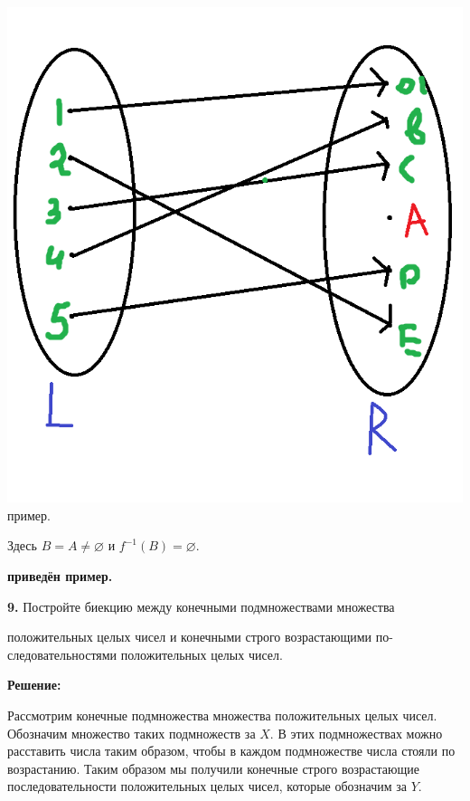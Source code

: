 \documentclass[a4paper,12pt]{article} %
\begin{document}
\begin{center}
\includegraphics[scale=0.5]{6 1}
пример.
\end{center}

Здесь $ B = {A} \neq \varnothing$ и $f^{-1}(B) = \varnothing$.

\begin{flushright}
\begin{large}
\textbf {приведён пример.}
\end{large}
\end{flushright}
\newpage
{\bf 9.} Постройте биекцию между конечными подмножествами множества

положительных целых чисел и конечными строго возрастающими по-
следовательностями положительных целых чисел.
\begin{center}
\bfseries
{\Large Решение: }
\end{center}

Рассмотрим конечные подмножества множества положительных целых чисел. Обозначим множество таких подмножеств за $X$. В этих подмножествах можно расставить числа таким образом, чтобы в каждом подмножестве числа стояли по возрастанию. Таким образом мы получили конечные строго возрастающие последовательности положительных целых чисел, которые обозначим за $Y$.
\end{document}
